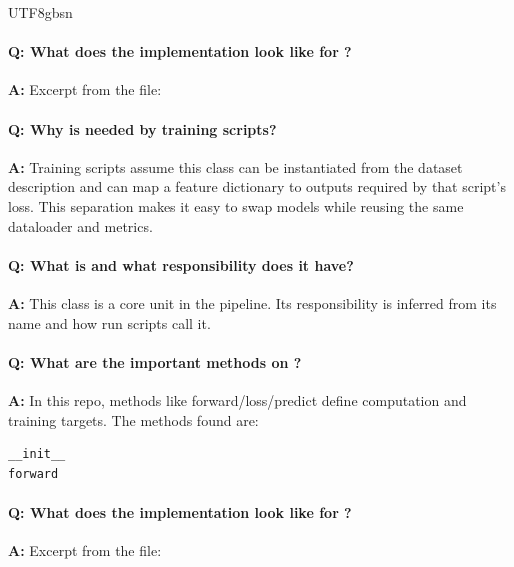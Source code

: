 \documentclass[11pt]{article}
\begin{document}
\begin{CJK*}{UTF8}{gbsn}
\paragraph{Q: What does the implementation look like for \texttt{}?}
\textbf{A:} Excerpt from the file:

\vspace{1mm}


\paragraph{Q: Why is \texttt{} needed by training scripts?}
\textbf{A:} Training scripts assume this class can be instantiated from the dataset description and can map a feature dictionary to outputs required by that script's loss. This separation makes it easy to swap models while reusing the same dataloader and metrics.

\paragraph{Q: What is \texttt{} and what responsibility does it have?}
\textbf{A:} This class is a core unit in the pipeline. Its responsibility is inferred from its name and how run scripts call it.

\paragraph{Q: What are the important methods on \texttt{}?}
\textbf{A:} In this repo, methods like forward/loss/predict define computation and training targets. The methods found are:

\begin{Verbatim}[fontsize=\small]
__init__
forward
\end{Verbatim}

\paragraph{Q: What does the implementation look like for \texttt{}?}
\textbf{A:} Excerpt from the file:

\vspace{1mm}



\end{CJK*}
\end{document}
